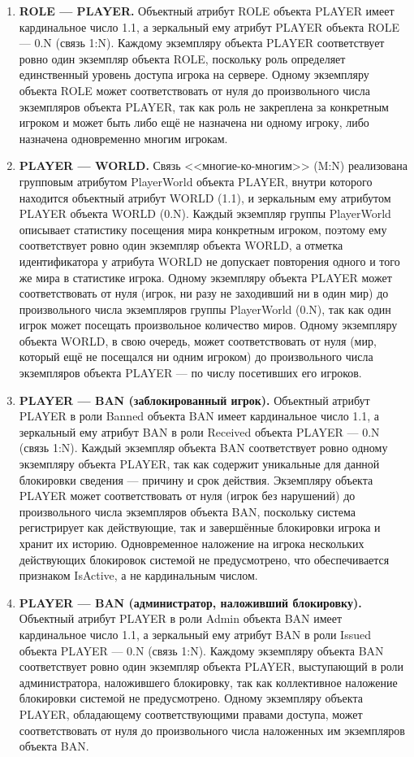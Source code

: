 \documentclass[a4paper, 14pt]{extarticle}
\begin{document}
\begin{enumerate}
    \item \textbf{ROLE --- PLAYER.} Объектный атрибут ROLE объекта PLAYER имеет кардинальное число 1.1, а зеркальный ему атрибут PLAYER объекта ROLE --- 0.N (связь 1:N). Каждому экземпляру объекта PLAYER соответствует ровно один экземпляр объекта ROLE, поскольку роль определяет единственный уровень доступа игрока на сервере. Одному экземпляру объекта ROLE может соответствовать от нуля до произвольного числа экземпляров объекта PLAYER, так как роль не закреплена за конкретным игроком и может быть либо ещё не назначена ни одному игроку, либо назначена одновременно многим игрокам.

    \item \textbf{PLAYER --- WORLD.} Связь <<многие-ко-многим>> (M:N) реализована групповым атрибутом PlayerWorld объекта PLAYER, внутри которого находится объектный атрибут WORLD (1.1), и зеркальным ему атрибутом PLAYER объекта WORLD (0.N). Каждый экземпляр группы PlayerWorld описывает статистику посещения мира конкретным игроком, поэтому ему соответствует ровно один экземпляр объекта WORLD, а отметка идентификатора у атрибута WORLD не допускает повторения одного и того же мира в статистике игрока. Одному экземпляру объекта PLAYER может соответствовать от нуля (игрок, ни разу не заходивший ни в один мир) до произвольного числа экземпляров группы PlayerWorld (0.N), так как один игрок может посещать произвольное количество миров. Одному экземпляру объекта WORLD, в свою очередь, может соответствовать от нуля (мир, который ещё не посещался ни одним игроком) до произвольного числа экземпляров объекта PLAYER --- по числу посетивших его игроков.

    \item \textbf{PLAYER --- BAN (заблокированный игрок).} Объектный атрибут PLAYER в роли Banned объекта BAN имеет кардинальное число 1.1, а зеркальный ему атрибут BAN в роли Received объекта PLAYER --- 0.N (связь 1:N). Каждый экземпляр объекта BAN соответствует ровно одному экземпляру объекта PLAYER, так как содержит уникальные для данной блокировки сведения --- причину и срок действия. Экземпляру объекта PLAYER может соответствовать от нуля (игрок без нарушений) до произвольного числа экземпляров объекта BAN, поскольку система регистрирует как действующие, так и завершённые блокировки игрока и хранит их историю. Одновременное наложение на игрока нескольких действующих блокировок системой не предусмотрено, что обеспечивается признаком IsActive, а не кардинальным числом.

    \item \textbf{PLAYER --- BAN (администратор, наложивший блокировку).} Объектный атрибут PLAYER в роли Admin объекта BAN имеет кардинальное число 1.1, а зеркальный ему атрибут BAN в роли Issued объекта PLAYER --- 0.N (связь 1:N). Каждому экземпляру объекта BAN соответствует ровно один экземпляр объекта PLAYER, выступающий в роли администратора, наложившего блокировку, так как коллективное наложение блокировки системой не предусмотрено. Одному экземпляру объекта PLAYER, обладающему соответствующими правами доступа, может соответствовать от нуля до произвольного числа наложенных им экземпляров объекта BAN.
\end{enumerate}
\end{document}
